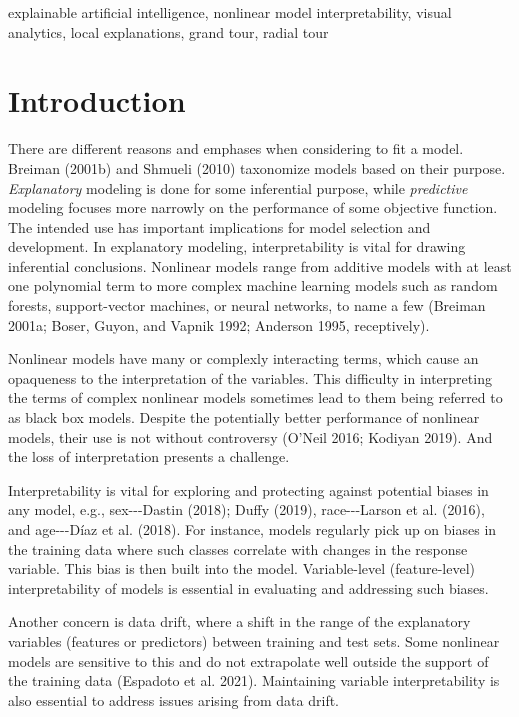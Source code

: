 \documentclass[11pt,twoside]{article}
\begin{document}
\begin{keywords}
explainable artificial intelligence, nonlinear model interpretability, visual analytics, local explanations, grand tour, radial tour
\end{keywords}


\hypertarget{sec:intro}{%
\section{Introduction}\label{sec:intro}}

There are different reasons and emphases when considering to fit a model. Breiman (2001b) and Shmueli (2010) taxonomize models based on their purpose. \emph{Explanatory} modeling is done for some inferential purpose, while \emph{predictive} modeling focuses more narrowly on the performance of some objective function. The intended use has important implications for model selection and development. In explanatory modeling, interpretability is vital for drawing inferential conclusions. Nonlinear models range from additive models with at least one polynomial term to more complex machine learning models such as random forests, support-vector machines, or neural networks, to name a few (Breiman 2001a; Boser, Guyon, and Vapnik 1992; Anderson 1995, receptively).

Nonlinear models have many or complexly interacting terms, which cause an opaqueness to the interpretation of the variables. This difficulty in interpreting the terms of complex nonlinear models sometimes lead to them being referred to as black box models. Despite the potentially better performance of nonlinear models, their use is not without controversy (O'Neil 2016; Kodiyan 2019). And the loss of interpretation presents a challenge.

Interpretability is vital for exploring and protecting against potential biases in any model, e.g., sex-\/-\/-Dastin (2018); Duffy (2019), race-\/-\/-Larson et al. (2016), and age-\/-\/-Díaz et al. (2018). For instance, models regularly pick up on biases in the training data where such classes correlate with changes in the response variable. This bias is then built into the model. Variable-level (feature-level) interpretability of models is essential in evaluating and addressing such biases.

Another concern is data drift, where a shift in the range of the explanatory variables (features or predictors) between training and test sets. Some nonlinear models are sensitive to this and do not extrapolate well outside the support of the training data (Espadoto et al. 2021). Maintaining variable interpretability is also essential to address issues arising from data drift.
\end{document}
